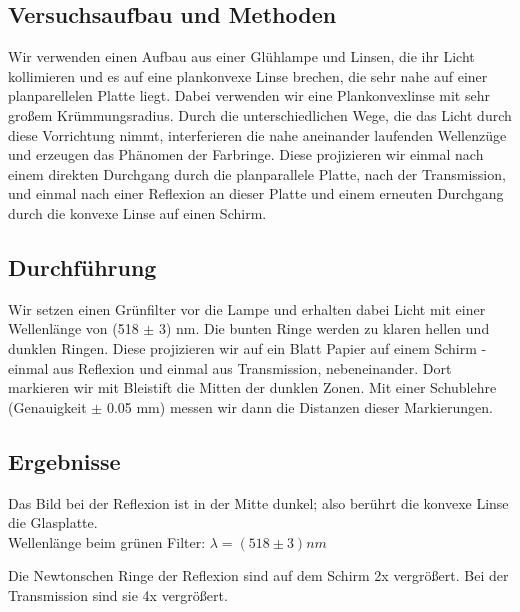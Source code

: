 \documentclass{article}
\begin{document}
\subsection{Versuchsaufbau und Methoden} Wir verwenden einen Aufbau aus einer Glühlampe und Linsen, die ihr Licht kollimieren und es auf eine plankonvexe Linse brechen, die sehr nahe auf einer planparellelen Platte liegt. Dabei verwenden wir eine Plankonvexlinse mit sehr großem Krümmungsradius. Durch die unterschiedlichen Wege, die das Licht durch diese Vorrichtung nimmt, interferieren die nahe aneinander laufenden Wellenzüge und erzeugen das Phänomen der Farbringe. Diese projizieren wir einmal nach einem direkten Durchgang durch die planparallele Platte, nach der Transmission, und einmal nach einer Reflexion an dieser Platte und einem erneuten Durchgang durch die konvexe Linse auf einen Schirm. 
\subsection{Durchführung}
Wir setzen einen Grünfilter vor die Lampe und erhalten dabei Licht mit einer Wellenlänge von (518 $\pm$ 3) nm. Die bunten Ringe werden zu klaren hellen und dunklen Ringen. Diese projizieren wir auf ein Blatt Papier auf einem Schirm - einmal aus Reflexion und einmal aus Transmission, nebeneinander. Dort markieren wir mit Bleistift die Mitten der dunklen Zonen. Mit einer Schublehre (Genauigkeit $\pm$ 0.05 mm) messen wir dann die Distanzen dieser Markierungen.
\subsection{Ergebnisse}
Das Bild bei der Reflexion ist in der Mitte dunkel; also berührt die konvexe Linse die Glasplatte. \\
Wellenlänge beim grünen Filter: $\lambda=(518 \pm 3)nm$

Die Newtonschen Ringe der Reflexion sind auf dem Schirm 2x vergrößert. Bei der Transmission sind sie 4x vergrößert.
\end{document}
